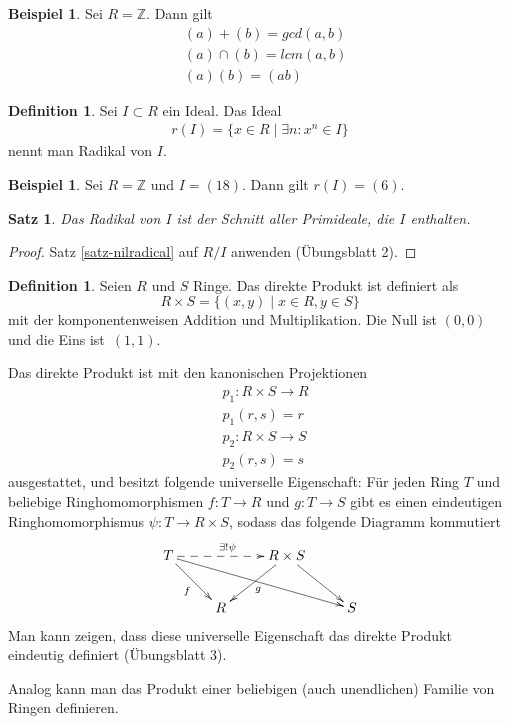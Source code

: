 \documentclass[reqno,12pt]{article}
\numberwithin{equation}{section}
\newcommand{\bZ}{\mathbb{Z}}
\theoremstyle{plain}
\newtheorem{proposition}[thm]{Satz}
\theoremstyle{definition}
\newtheorem{definition}[thm]{Definition}
\newtheorem{example}[thm]{Beispiel}
\begin{document}
\begin{example}
  Sei $R=\bZ$. Dann gilt
  \begin{align*}
    & (a) + (b) = gcd (a,b) \\
    & (a) \cap (b) = lcm (a,b) \\
    & (a)(b) = (ab)
  \end{align*}
\end{example}


\begin{definition}
  Sei $I \subset R$ ein Ideal. Das Ideal
  \begin{align*}
    r(I) = \{x \in R \mid \exists n : x^n \in I \}
  \end{align*}
  nennt man {\sf Radikal} von $I$.
\end{definition}

\begin{example}
Sei $R=\bZ$ und $I = (18)$. Dann gilt $r(I) = (6)$.
\end{example}

\begin{proposition}
Das Radikal von $I$ ist der Schnitt aller Primideale, die $I$ enthalten.
\end{proposition}

\begin{proof}
  Satz \ref{satz-nilradical} auf $R/I$ anwenden (Übungsblatt 2).
\end{proof}

\begin{definition}
  Seien $R$ und $S$ Ringe. Das {\sf direkte Produkt} ist definiert als
  $$
  R \times S = \{ (x,y) \mid x \in R, y \in S \}
  $$
  mit der komponentenweisen Addition und Multiplikation. Die Null ist $(0,0)$ und die Eins ist~$(1,1)$.

  Das direkte Produkt ist mit den  kanonischen Projektionen
  \begin{align*}
  & p_1 \colon R \times S \to R \\
  & p_1(r,s)=r \\
  & p_2 \colon R \times S \to S \\
  & p_2(r,s)=s
  \end{align*}
  ausgestattet, und besitzt folgende {\sf universelle Eigenschaft}: Für jeden Ring $T$ und beliebige Ringhomomorphismen $f \colon T \to R$ und $g \colon T \to S$ gibt es einen eindeutigen Ringhomomorphismus $\psi \colon T \to R\times S$, sodass das folgende Diagramm kommutiert
  \begin{align*}
    \xymatrix{
     T \ar@{-->}[rr]^{\exists ! \psi } \ar[dr]_f \ar[drrr]_g &&   R \times S \ar[dl] \ar[dr]\\
     & R & & S
    }
  \end{align*}
Man kann zeigen, dass diese universelle Eigenschaft das direkte Produkt eindeutig definiert (Übungsblatt 3).

Analog kann man das Produkt einer beliebigen (auch unendlichen) Familie von Ringen definieren.
\end{definition}
\end{document}
